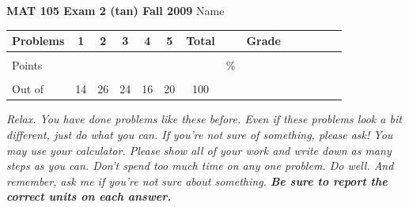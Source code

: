 \documentclass[12pt]{article}
\begin{document}
\textbf{MAT 105 Exam 2 (tan) Fall 2009} \hspace{.4in} {\large Name} \hrulefill

\begin{center}

\begin{tabular}
{|l|c|c|c|c|c|c|c|c|c|c|c|c|c|} \hline

 Problems & \hspace{5 pt} 1 \hspace{5 pt}  & \hspace{5 pt} 2 \hspace{5 pt} & \hspace{5 pt} 3  \hspace{5 pt} & \hspace{5 pt} 4  \hspace{5 pt} & \hspace{5 pt}5 \hspace{5 pt} & \hspace{5 pt} Total  \hspace{5 pt} & &  \hspace{5 pt} Grade \hspace{5 pt}  \\ \hline
&&&&&&&&\\  
Points &&&&&&&    \hspace{.8in}\% &  \\ 
&&&&&&&& \\  \hline
Out of & 14 & 26 & 24  & 16 & 20 &100 & & \\ \hline

\end {tabular}

\end{center}

\vspace{.2in}

 \emph{Relax.  You have done problems like these before.  Even if these problems look a bit different, just do what you can.  If you're not sure of something, please ask! You may use your calculator.  Please show all of your work and write down as many steps as you can.  Don't spend too much time on any one problem.  Do well.  And remember, ask me if you're not sure about something.  \textbf{Be sure to report the correct units on each answer.}}

\hrulefill
\end{document}
